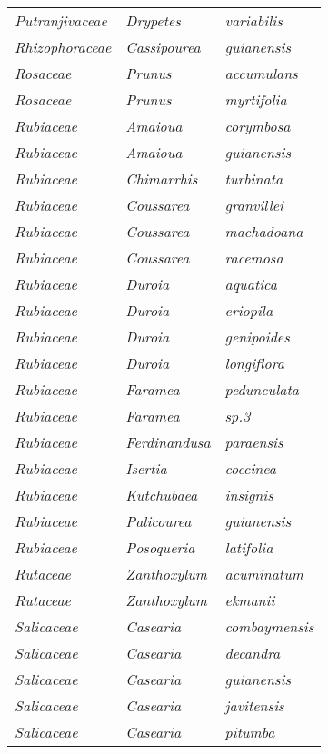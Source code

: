 \documentclass[fleqn,10pt]{ArtEcoFoG} %
\renewenvironment{table}{\begin{table*}}{\end{table*}\ignorespacesafterend}
\begin{document}
\begin{table}
\begin{tabular}[t]{lll}
\addlinespace
\em{Putranjivaceae} & \em{Drypetes} & \em{variabilis}\\
\em{Rhizophoraceae} & \em{Cassipourea} & \em{guianensis}\\
\em{Rosaceae} & \em{Prunus} & \em{accumulans}\\
\em{Rosaceae} & \em{Prunus} & \em{myrtifolia}\\
\em{Rubiaceae} & \em{Amaioua} & \em{corymbosa}\\
\addlinespace
\em{Rubiaceae} & \em{Amaioua} & \em{guianensis}\\
\em{Rubiaceae} & \em{Chimarrhis} & \em{turbinata}\\
\em{Rubiaceae} & \em{Coussarea} & \em{granvillei}\\
\em{Rubiaceae} & \em{Coussarea} & \em{machadoana}\\
\em{Rubiaceae} & \em{Coussarea} & \em{racemosa}\\
\addlinespace
\em{Rubiaceae} & \em{Duroia} & \em{aquatica}\\
\em{Rubiaceae} & \em{Duroia} & \em{eriopila}\\
\em{Rubiaceae} & \em{Duroia} & \em{genipoides}\\
\em{Rubiaceae} & \em{Duroia} & \em{longiflora}\\
\em{Rubiaceae} & \em{Faramea} & \em{pedunculata}\\
\addlinespace
\em{Rubiaceae} & \em{Faramea} & \em{sp.3}\\
\em{Rubiaceae} & \em{Ferdinandusa} & \em{paraensis}\\
\em{Rubiaceae} & \em{Isertia} & \em{coccinea}\\
\em{Rubiaceae} & \em{Kutchubaea} & \em{insignis}\\
\em{Rubiaceae} & \em{Palicourea} & \em{guianensis}\\
\addlinespace
\em{Rubiaceae} & \em{Posoqueria} & \em{latifolia}\\
\em{Rutaceae} & \em{Zanthoxylum} & \em{acuminatum}\\
\em{Rutaceae} & \em{Zanthoxylum} & \em{ekmanii}\\
\em{Salicaceae} & \em{Casearia} & \em{combaymensis}\\
\em{Salicaceae} & \em{Casearia} & \em{decandra}\\
\addlinespace
\em{Salicaceae} & \em{Casearia} & \em{guianensis}\\
\em{Salicaceae} & \em{Casearia} & \em{javitensis}\\
\em{Salicaceae} & \em{Casearia} & \em{pitumba}\\

\end{tabular}
\end{table}
\end{document}

